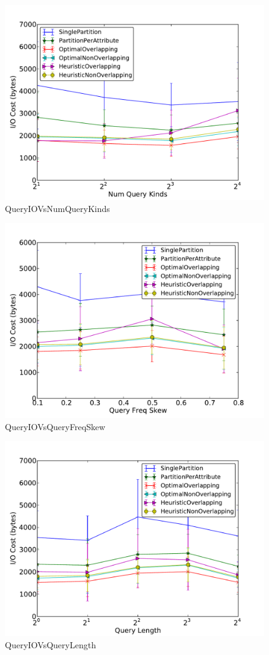 \begin{figure}[ht]
\centerline{\includegraphics[width=0.9\columnwidth]{figures/QueryIOVsNumQueryKinds.pdf}}
\caption{QueryIOVsNumQueryKinds}
\end{figure}

\begin{figure}[ht]
 \centerline{\includegraphics[width=0.9\columnwidth]{figures/QueryIOVsQueryFreqSkew.pdf}}
 \caption{QueryIOVsQueryFreqSkew}
 \end{figure}

 \begin{figure}[ht]
 \centerline{\includegraphics[width=0.9\columnwidth]{figures/QueryIOVsQueryLength.pdf}}
 \caption{QueryIOVsQueryLength}
 \end{figure}

